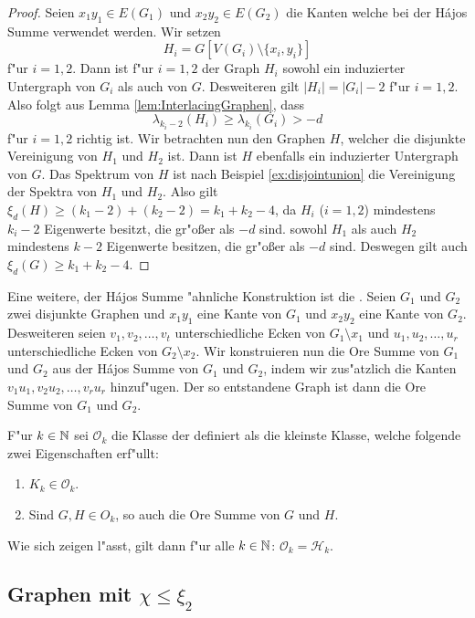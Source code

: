 \begin{proof}
  Seien $x_1y_1\in E(G_1)$ und $x_2y_2\in E(G_2)$ die Kanten welche bei der H\'ajos Summe verwendet werden. Wir setzen $$H_i = G[V(G_i)\setminus\{x_i,y_i\}] $$ f"ur $i=1,2$. Dann ist f"ur $i=1,2$ der Graph $H_i$ sowohl ein induzierter Untergraph von $G_i$ als auch von $G$. 
  Desweiteren gilt $|H_i| = |G_i|-2$ f"ur $i=1,2$. Also folgt aus Lemma \ref{lem:InterlacingGraphen}, dass $$\lambda_{k_i-2}(H_i) \geq \lambda_{k_i}(G_i) > -d$$ f"ur $i=1,2$ richtig ist. Wir betrachten nun den Graphen $H$, welcher die disjunkte Vereinigung von $H_1$ und $H_2$ ist. Dann ist $H$ ebenfalls ein induzierter Untergraph von $G$. 
  Das Spektrum von $H$ ist nach Beispiel \ref{ex:disjointunion} die Vereinigung der Spektra von $H_1$ und $H_2$. Also gilt $\xi_{d}(H) \geq (k_1-2)+ (k_2-2) = k_1+k_2-4$, da $H_i$ ($i=1,2$) mindestens $k_i -2$ Eigenwerte besitzt, die gr"o{\ss}er als $-d$ sind.
  sowohl $H_1$ als auch $H_2$ mindestens $k-2$ Eigenwerte besitzen, die gr"o{\ss}er als $-d$ sind. 
  Deswegen gilt auch $\xi_{d}(G) \geq k_1+k_2-4$.
\end{proof}

Eine weitere, der H\'ajos Summe "ahnliche Konstruktion ist die  \cite{Ore67}. Seien $G_1$ und $G_2$ zwei disjunkte Graphen und $x_1y_1$ eine Kante von $G_1$ und $x_2y_2$ eine Kante von $G_2$. Desweiteren seien $v_1,v_2,\dots,v_t$ unterschiedliche Ecken von $G_1\setminus x_1$ und $u_1,u_2,\dots,u_r$ unterschiedliche Ecken von $G_2\setminus x_2$. Wir konstruieren nun die Ore Summe von $G_1$ und $G_2$ aus der H\'ajos Summe von $G_1$ und $G_2$, indem wir zus"atzlich die Kanten $v_1u_1,v_2u_2,\dots,v_ru_r$ hinzuf"ugen. Der so entstandene Graph ist dann die Ore Summe von $G_1$ und $G_2$. 

F"ur $k\in {\mathbb{N}}$ sei $\mathcal{O}_k$ die Klasse der  definiert als die kleinste Klasse, welche folgende zwei Eigenschaften erf"ullt:
\begin{enumerate}
  \item $K_k\in \mathcal{O}_k$.
  \item Sind $G,H\in O_k$, so auch die Ore Summe von $G$ und $H$.
\end{enumerate}

Wie sich zeigen l"asst, gilt dann f"ur alle $k\in{\mathbb{N}}$: $\mathcal{O}_k = \mathcal{H}_k$.

\subsection{Graphen mit $\chi \leq \xi_{2}$}

